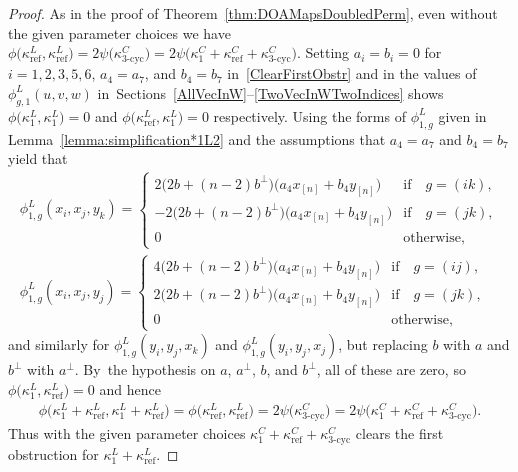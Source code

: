 \documentclass[10pt,a4paper]{amsart}
\numberwithin{equation}{section}
\DeclareMathOperator{\refl}{ref}
\DeclareMathOperator{\tri}{3-cyc}
\begin{document}
\begin{proof}
As in the proof of Theorem~\ref{thm:DOAMapsDoubledPerm},
even without the given parameter choices we have
$\phi\big(\kappa^L_{\refl},\kappa^L_{\refl}\big)=2\psi\big(\kappa^C_{\tri}\big)=
2\psi\big(\kappa^C_1+\kappa^C_{\refl}+\kappa^C_{\tri}\big)$.
Setting $a_i=b_i=0$ for $i=1, 2, 3, 5, 6$, $a_4=a_7$, and $b_4=b_7$
in~\eqref{ClearFirstObstr} and in the values of $\phi^L_{g,1}(u,v,w)$
in~Sections~\ref{AllVecInW}--\ref{TwoVecInWTwoIndices} shows
$\phi\big(\kappa^L_1,\kappa^L_1\big)=0$ and $\phi\big(\kappa^L_{\refl},\kappa^L_1\big)=0$ respectively.
Using the forms of $\phi^L_{1,g}$ given in Lemma~\ref{lemma:simplification*1L2} and the assumptions that $a_4=a_7$ and $b_4=b_7$ yield that
\begin{gather*}
\phi^L_{1,g}(x_i,x_j,y_k)=
\begin{cases}
2\big(2b + (n-2)b^\perp\big)\big(a_4x_{[n]}+b_4y_{[n]}\big) & \text{if}\quad g=(ik), \\
-2\big(2b + (n-2)b^\perp\big)\big(a_4x_{[n]}+b_4y_{[n]}\big) & \text{if}\quad g=(jk), \\
0 & \text{otherwise},
\end{cases}
\\
\phi^L_{1,g}(x_i,x_j,y_j)=
\begin{cases}
4\big(2b + (n-2)b^\perp\big)\big(a_4x_{[n]}+b_4y_{[n]}\big) & \text{if}\quad g=(ij), \\
2\big(2b + (n-2)b^\perp\big)\big(a_4x_{[n]}+b_4y_{[n]}\big) & \text{if}\quad g=(jk), \\
 0 & \text{otherwise},
\end{cases}
\end{gather*}
and
similarly for $\phi^L_{1,g}(y_i,y_j,x_k)$ and $\phi^L_{1,g}(y_i,y_j,x_j)$,
but replacing $b$ with $a$ and $b^\perp$ with $a^\perp$. By~the hypothesis on $a$, $a^\perp$, $b$, and $b^\perp$, all of these are zero,
so $\phi\big(\kappa^L_1,\kappa^L_{\refl}\big)=0$
and hence
\begin{gather*}
\phi\big(\kappa^L_1+\kappa^L_{\refl},\kappa^L_1+\kappa^L_{\refl}\big)=
\phi\big(\kappa^L_{\refl},\kappa^L_{\refl}\big)=
2\psi\big(\kappa^C_{\tri}\big)=
2\psi\big(\kappa^C_1+\kappa^C_{\refl}+\kappa^C_{\tri}\big).
\end{gather*}
Thus with the given parameter choices
$\kappa^C_1+\kappa^C_{\refl}+\kappa^C_{\tri}$
clears the first obstruction for $\kappa^L_1+\kappa^L_{\refl}$.


\end{proof}
\end{document}

